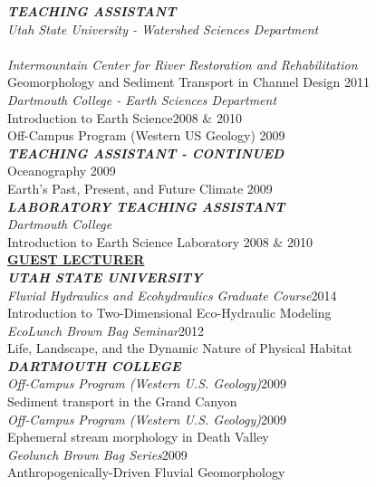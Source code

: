 \documentclass{article}
\begin{document}
\noindent \textbf{\textit{TEACHING ASSISTANT}}\\
\textit{Utah State University - Watershed Sciences Department}\\
\\
\textit{Intermountain Center for River Restoration and Rehabilitation}\\
\indent Geomorphology and Sediment Transport in Channel Design \hfill 2011\\
\textit{Dartmouth College - Earth Sciences Department}\\
\indent Introduction to Earth Science\hfill{}2008 $\&$ 2010\\
\indent Off-Campus Program (Western US Geology) \hfill{} 2009\\
\noindent \textbf{\textit{TEACHING ASSISTANT - CONTINUED}}\\
\indent Oceanography \hfill{} 2009\\
\indent Earth's Past, Present, and Future Climate \hfill{} 2009\\

\noindent \textit{\textbf{LABORATORY TEACHING ASSISTANT}}\\
\textit{Dartmouth College}\\
\indent Introduction to Earth Science Laboratory \hfill{} 2008 $\&$ 2010\\

%


\noindent \textbf{\underline{GUEST LECTURER}}\\
\textit{\textbf{UTAH STATE UNIVERSITY}}\\
\textit{Fluvial Hydraulics and Ecohydraulics Graduate Course}\hfill 2014\\
Introduction to Two-Dimensional Eco-Hydraulic Modeling\\
\textit{EcoLunch Brown Bag Seminar}\hfill 2012\\
Life, Landscape, and the Dynamic Nature of Physical Habitat\\

\noindent \textit{\textbf{DARTMOUTH COLLEGE}}\\
\textit{Off-Campus Program (Western U.S. Geology)}\hfill 2009\\
Sediment transport in the Grand Canyon\\
\textit{Off-Campus Program (Western U.S. Geology)}\hfill 2009\\
Ephemeral stream morphology in Death Valley\\
\textit{Geolunch Brown Bag Series}\hfill 2009\\
Anthropogenically-Driven Fluvial Geomorphology\\
\end{document}

